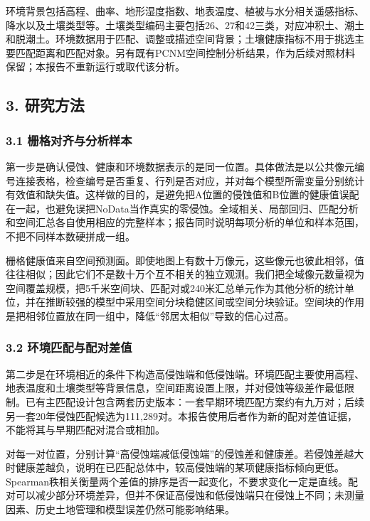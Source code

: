 \documentclass[
  10.5pt,
]{article}
\begin{document}
环境背景包括高程、曲率、地形湿度指数、地表温度、植被与水分相关遥感指标、降水以及土壤类型等。土壤类型编码主要包括26、27和42三类，对应冲积土、潮土和脱潮土。环境数据用于匹配、调整或描述空间背景；土壤健康指标不用于挑选主要匹配距离和匹配对象。另有既有PCNM空间控制分析结果，作为后续对照材料保留；本报告不重新运行或取代该分析。

\hypertarget{ux7814ux7a76ux65b9ux6cd5}{%
\subsection{3. 研究方法}\label{ux7814ux7a76ux65b9ux6cd5}}

\hypertarget{ux6805ux683cux5bf9ux9f50ux4e0eux5206ux6790ux6837ux672c}{%
\subsubsection{3.1
栅格对齐与分析样本}\label{ux6805ux683cux5bf9ux9f50ux4e0eux5206ux6790ux6837ux672c}}

第一步是确认侵蚀、健康和环境数据表示的是同一位置。具体做法是以公共像元编号连接表格，检查编号是否重复、行列是否对应，并对每个模型所需变量分别统计有效值和缺失值。这样做的目的，是避免把A位置的侵蚀值和B位置的健康值误配在一起，也避免误把NoData当作真实的零侵蚀。全域相关、局部回归、匹配分析和空间汇总各自使用相应的完整样本；报告同时说明每项分析的单位和样本范围，不把不同样本数硬拼成一组。

栅格健康值来自空间预测面。即使地图上有数十万像元，这些像元也彼此相邻，值往往相似；因此它们不是数十万个互不相关的独立观测。我们把全域像元数量视为空间覆盖规模，把5千米空间块、匹配对或240米汇总单元作为其他分析的统计单位，并在推断较强的模型中采用空间分块稳健区间或空间分块验证。空间块的作用是把相邻位置放在同一组中，降低``邻居太相似''导致的信心过高。

\hypertarget{ux73afux5883ux5339ux914dux4e0eux914dux5bf9ux5deeux503c}{%
\subsubsection{3.2
环境匹配与配对差值}\label{ux73afux5883ux5339ux914dux4e0eux914dux5bf9ux5deeux503c}}

第二步是在环境相近的条件下构造高侵蚀端和低侵蚀端。环境匹配主要使用高程、地表温度和土壤类型等背景信息，空间距离设置上限，并对侵蚀等级差作最低限制。已有主匹配设计包含两套历史版本：一套早期环境匹配方案约有九万对；后续另一套20年侵蚀匹配候选为111,289对。本报告使用后者作为新的配对差值证据，不能将其与早期匹配对混合或相加。

对每一对位置，分别计算``高侵蚀端减低侵蚀端''的侵蚀差和健康差。若侵蚀差越大时健康差越负，说明在已匹配总体中，较高侵蚀端的某项健康指标倾向更低。Spearman秩相关衡量两个差值的排序是否一起变化，不要求变化一定是直线。配对可以减少部分环境差异，但并不保证高侵蚀和低侵蚀端只在侵蚀上不同；未测量因素、历史土地管理和模型误差仍然可能影响结果。
\end{document}
